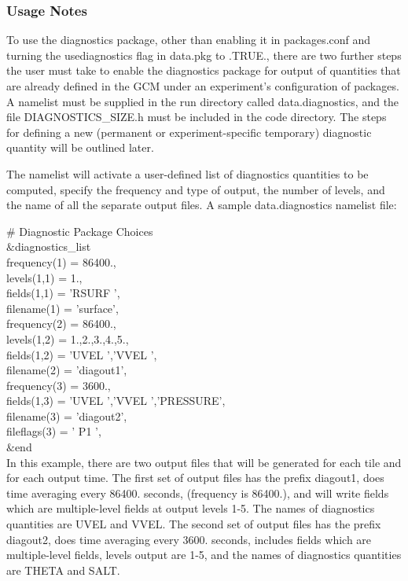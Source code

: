 \subsubsection{Usage Notes}
\label{sec:diagnostics:usersguide}

\noindent
To use the diagnostics package, other than enabling it in packages.conf
and turning the usediagnostics flag in data.pkg to .TRUE., there are two
further steps the user must take to enable the diagnostics package for
output of quantities that are already defined in the GCM under an experiment's
configuration of packages.  A namelist must be supplied in the run directory 
called data.diagnostics, and the file DIAGNOSTICS\_SIZE.h must be included in the 
code directory.  The steps for defining a new (permanent or experiment-specific 
temporary) diagnostic quantity will be outlined later. 

\noindent The namelist will activate a user-defined list of diagnostics quantities 
to be computed, specify the frequency and type of output, the number of levels, and 
the name of all the separate output files. A sample data.diagnostics namelist file:

\noindent
$\#$ Diagnostic Package Choices \\
 $\&$diagnostics\_list \\
  frequency(1) = 86400., \ \\
   levels(1,1) = 1., \ \\
   fields(1,1) = 'RSURF   ', \ \\
   filename(1) = 'surface', \ \\
  frequency(2) = 86400., \ \\
   levels(1,2) = 1.,2.,3.,4.,5., \ \\
   fields(1,2) = 'UVEL    ','VVEL    ', \ \\
   filename(2) = 'diagout1', \ \\
  frequency(3) = 3600., \ \\
   fields(1,3) = 'UVEL    ','VVEL    ','PRESSURE', \ \\
   filename(3) = 'diagout2', \ \\
  fileflags(3) = ' P1     ', \ \\
 $\&$end \ \\

\noindent
In this example, there are two output files that will be generated
for each tile and for each output time. The first set of output files
has the prefix diagout1, does time averaging every 86400. seconds,
(frequency is 86400.), and will write fields which are multiple-level 
fields at output levels 1-5. The names of diagnostics quantities are 
UVEL and VVEL.  The second set of output files
has the prefix diagout2, does time averaging every 3600. seconds,
includes fields which are multiple-level fields, levels output are 1-5,
and the names of diagnostics quantities are THETA and SALT.


